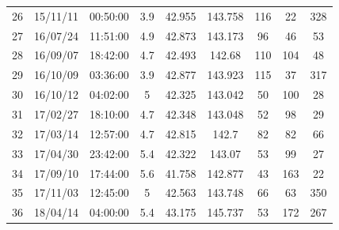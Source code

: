 {\begin{table}[!ht]
{\begin{tabular}{@{}ccccccccc@{}}
      26 & 15/11/11        & 00:50:00        & 3.9   & 42.955       & 143.758       & 116        & 22            & 328         \\
      27 & 16/07/24        & 11:51:00        & 4.9   & 42.873       & 143.173       & 96         & 46            & 53          \\
      28 & 16/09/07        & 18:42:00        & 4.7   & 42.493       & 142.68        & 110        & 104           & 48          \\
      29 & 16/10/09        & 03:36:00        & 3.9   & 42.877       & 143.923       & 115        & 37            & 317         \\
      30 & 16/10/12        & 04:02:00        & 5     & 42.325       & 143.042       & 50         & 100           & 28          \\
      31 & 17/02/27        & 18:10:00        & 4.7   & 42.348       & 143.048       & 52         & 98            & 29          \\
      32 & 17/03/14        & 12:57:00        & 4.7   & 42.815       & 142.7         & 82         & 82            & 66          \\
      33 & 17/04/30        & 23:42:00        & 5.4   & 42.322       & 143.07        & 53         & 99            & 27          \\
      34 & 17/09/10        & 17:44:00        & 5.6   & 41.758       & 142.877       & 43         & 163           & 22          \\
      35 & 17/11/03        & 12:45:00        & 5     & 42.563       & 143.748       & 66         & 63            & 350         \\
      36 & 18/04/14        & 04:00:00        & 5.4   & 43.175       & 145.737       & 53         & 172           & 267         \\ \bottomrule
    \end{tabular}}
\end{table}



}
